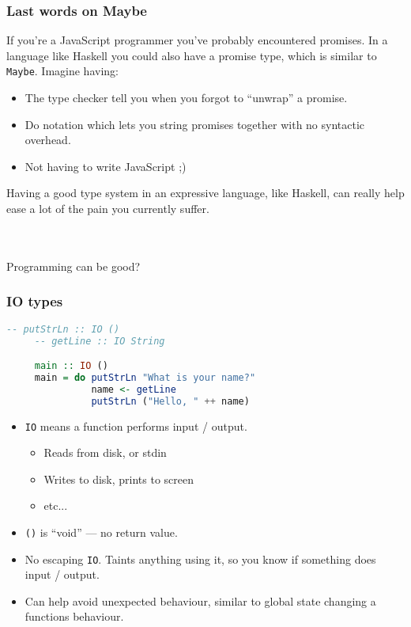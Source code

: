 \documentclass{beamer}
\begin{document}
\begin{frame}
  \frametitle{Last words on Maybe}
  
  If you're a JavaScript programmer you've probably encountered
  promises. In a language like Haskell you could also have a promise
  type, which is similar to \texttt{Maybe}. Imagine having:

  \begin{itemize}
  \pause
  \item The type checker tell you when you forgot to ``unwrap'' a promise.
  \pause
  \item Do notation which lets you string promises together with no syntactic overhead.
  \pause
  \item Not having to write JavaScript ;)
  \end{itemize}

  Having a good type system in an expressive language, like Haskell,
  can really help ease a lot of the pain you currently suffer.

  \pause \\~\\

  Programming can be good?
\end{frame}

\begin{frame}[fragile]
  \frametitle{IO types}

  \begin{lstlisting}[frame=single, language=Haskell, breaklines=true, basicstyle=\ttfamily\tiny]
     -- putStrLn :: IO ()
     -- getLine :: IO String

     main :: IO ()
     main = do putStrLn "What is your name?"
               name <- getLine
               putStrLn ("Hello, " ++ name)
  \end{lstlisting}

  \begin{itemize}
  \pause
  \item \texttt{IO} means a function performs input / output.
    \begin{itemize}
    \pause
    \item Reads from disk, or stdin
    \pause
    \item Writes to disk, prints to screen
    \pause
    \item etc...
    \end{itemize}
  \pause
  \item \texttt{()} is ``void'' --- no return value.
  \pause
  \item No escaping \texttt{IO}. Taints anything using it, so you know if something does input / output.
  \pause
  \item Can help avoid unexpected behaviour, similar to global state changing a functions behaviour.
  \end{itemize}
\end{frame}
\end{document}
